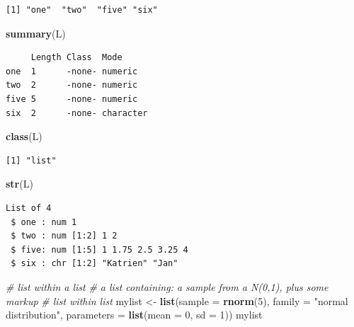 \documentclass[
]{book}
\newenvironment{Shaded}{\begin{snugshade}}{\end{snugshade}}
\newcommand{\CommentTok}[1]{\textcolor[rgb]{0.56,0.35,0.01}{\textit{#1}}}
\newcommand{\DataTypeTok}[1]{\textcolor[rgb]{0.13,0.29,0.53}{#1}}
\newcommand{\DecValTok}[1]{\textcolor[rgb]{0.00,0.00,0.81}{#1}}
\newcommand{\KeywordTok}[1]{\textcolor[rgb]{0.13,0.29,0.53}{\textbf{#1}}}
\newcommand{\NormalTok}[1]{#1}
\newcommand{\StringTok}[1]{\textcolor[rgb]{0.31,0.60,0.02}{#1}}
\begin{document}
\begin{verbatim}
[1] "one"  "two"  "five" "six" 
\end{verbatim}

\begin{Shaded}
\begin{Highlighting}[]
\KeywordTok{summary}\NormalTok{(L)}
\end{Highlighting}
\end{Shaded}

\begin{verbatim}
     Length Class  Mode     
one  1      -none- numeric  
two  2      -none- numeric  
five 5      -none- numeric  
six  2      -none- character
\end{verbatim}

\begin{Shaded}
\begin{Highlighting}[]
\KeywordTok{class}\NormalTok{(L)}
\end{Highlighting}
\end{Shaded}

\begin{verbatim}
[1] "list"
\end{verbatim}

\begin{Shaded}
\begin{Highlighting}[]
\KeywordTok{str}\NormalTok{(L)}
\end{Highlighting}
\end{Shaded}

\begin{verbatim}
List of 4
 $ one : num 1
 $ two : num [1:2] 1 2
 $ five: num [1:5] 1 1.75 2.5 3.25 4
 $ six : chr [1:2] "Katrien" "Jan"
\end{verbatim}

\begin{Shaded}
\begin{Highlighting}[]
\CommentTok{# list within a list}
\CommentTok{# a list containing: a sample from a N(0,1), plus some markup}
\CommentTok{# list within list}
\NormalTok{mylist <-}\StringTok{ }\KeywordTok{list}\NormalTok{(}\DataTypeTok{sample =} \KeywordTok{rnorm}\NormalTok{(}\DecValTok{5}\NormalTok{), }\DataTypeTok{family =} \StringTok{"normal distribution"}\NormalTok{, }\DataTypeTok{parameters =} \KeywordTok{list}\NormalTok{(}\DataTypeTok{mean =} \DecValTok{0}\NormalTok{, }\DataTypeTok{sd =} \DecValTok{1}\NormalTok{))}
\NormalTok{mylist}
\end{Highlighting}
\end{Shaded}
\end{document}
